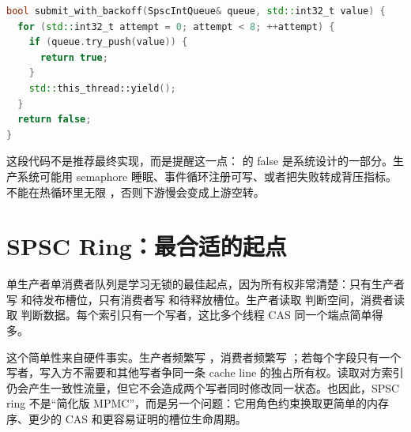 \begin{lstlisting}[language=C++,caption={try 接口必须配套外层策略}]
bool submit_with_backoff(SpscIntQueue& queue, std::int32_t value) {
  for (std::int32_t attempt = 0; attempt < 8; ++attempt) {
    if (queue.try_push(value)) {
      return true;
    }
    std::this_thread::yield();
  }
  return false;
}
\end{lstlisting}

这段代码不是推荐最终实现，而是提醒这一点： 的 false 是系统设计的一部分。生产系统可能用 semaphore 睡眠、事件循环注册可写、或者把失败转成背压指标。不能在热循环里无限 ，否则下游慢会变成上游空转。

\section{SPSC Ring：最合适的起点}

单生产者单消费者队列是学习无锁的最佳起点，因为所有权非常清楚：只有生产者写  和待发布槽位，只有消费者写  和待释放槽位。生产者读取  判断空间，消费者读取  判断数据。每个索引只有一个写者，这比多个线程 CAS 同一个端点简单得多。

这个简单性来自硬件事实。生产者频繁写 ，消费者频繁写 ；若每个字段只有一个写者，写入方不需要和其他写者争同一条 cache line 的独占所有权。读取对方索引仍会产生一致性流量，但它不会造成两个写者同时修改同一状态。也因此，SPSC ring 不是“简化版 MPMC”，而是另一个问题：它用角色约束换取更简单的内存序、更少的 CAS 和更容易证明的槽位生命周期。

